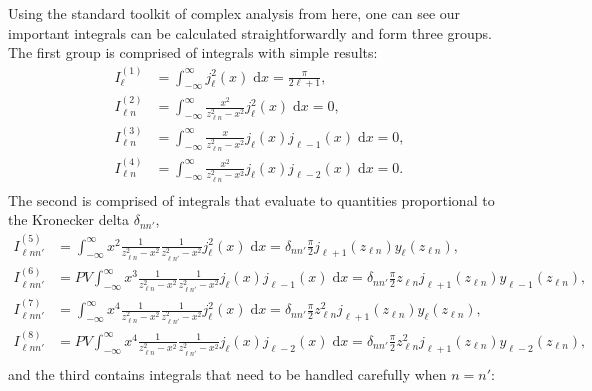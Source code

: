 Using the standard toolkit of complex analysis from here, one can see our important integrals can be calculated straightforwardly and form three groups. The first group is comprised of integrals with simple results:
\begin{equation}
\begin{split}
I^{(1)}_\ell &= \int_{-\infty}^\infty j_\ell^2(x)\;\mathrm{d}x = \frac{\pi}{2\ell + 1},\\
I^{(2)}_{\ell n} &= \int_{-\infty}^\infty\frac{x^2}{z_{\ell n}^2 - x^2}j_\ell^2(x)\;\mathrm{d}x = 0,\\
I^{(3)}_{\ell n} &= \int_{-\infty}^\infty\frac{x}{z_{\ell n}^2 - x^2}j_\ell(x)j_{\ell - 1}(x)\;\mathrm{d}x = 0,\\
I^{(4)}_{\ell n} &= \int_{-\infty}^\infty\frac{x^2}{z_{\ell n}^2 - x^2}j_\ell(x)j_{\ell - 2}(x)\;\mathrm{d}x = 0.\\
\end{split}
\end{equation}
The second is comprised of integrals that evaluate to quantities proportional to the Kronecker delta $\delta_{nn'}$,
\begin{equation}
\begin{split}
I^{(5)}_{\ell nn'} &= \int_{-\infty}^\infty x^2\frac{1}{z_{\ell n}^2 - x^2}\frac{1}{z_{\ell n'}^2 - x^2}j_\ell^2(x)\;\mathrm{d}x = \delta_{nn'}\frac{\pi}{2}j_{\ell + 1}(z_{\ell n})y_\ell(z_{\ell n}),\\
I^{(6)}_{\ell nn'} &= PV\int_{-\infty}^\infty x^3\frac{1}{z_{\ell n}^2 - x^2}\frac{1}{z_{\ell n'}^2 - x^2}j_\ell(x)j_{\ell - 1}(x)\;\mathrm{d}x = \delta_{nn'}\frac{\pi}{2}z_{\ell n}j_{\ell + 1}(z_{\ell n})y_{\ell - 1}(z_{\ell n}),\\
I^{(7)}_{\ell nn'} &= \int_{-\infty}^\infty x^4\frac{1}{z_{\ell n}^2 - x^2}\frac{1}{z_{\ell n'}^2 - x^2}j_\ell^2(x)\;\mathrm{d}x = \delta_{nn'}\frac{\pi}{2}z_{\ell n}^2j_{\ell + 1}(z_{\ell n})y_\ell(z_{\ell n}),\\
I^{(8)}_{\ell nn'} &= PV\int_{-\infty}^\infty x^4\frac{1}{z_{\ell n}^2 - x^2}\frac{1}{z_{\ell n'}^2 - x^2}j_\ell(x)j_{\ell - 2}(x)\;\mathrm{d}x = \delta_{nn'}\frac{\pi}{2}z_{\ell n}^2j_{\ell + 1}(z_{\ell n})y_{\ell - 2}(z_{\ell n}),\\
\end{split}
\end{equation}
and the third contains integrals that need to be handled carefully when $n = n'$:
